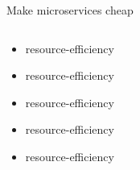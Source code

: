 \documentclass{beamer}
\begin{document}
\begin{frame}{Make microservices cheap}
    \begin{columns}
        \begin{column}{0.36\textwidth}
            \begin{itemize}
                \item resource-efficiency
                \item resource-efficiency
                \item resource-efficiency
                \item resource-efficiency
                \item resource-efficiency
            \end{itemize}
        \end{column}
        \begin{column}{0.36\textwidth}
        \end{column}
        \begin{column}{0.36\textwidth}
        \end{column}
    \end{columns}
\end{frame}
\end{document}
